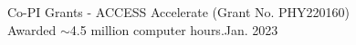 \documentclass{resume} %
\begin{document}

\begin{rSection}{Co-PI Grants}
- ACCESS Accelerate (Grant No. PHY220160) \\ Awarded $\sim$4.5 million computer hours.\hfill Jan. 2023
\end{rSection}

\end{document}
